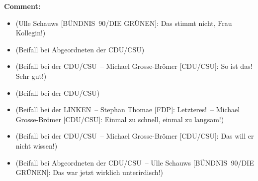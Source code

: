 \documentclass{article}
\begin{document}
\noindent\textbf{Comment:}
\begin{itemize}
    \setlength\itemsep{-3pt}
    \item (Ulle Schauws [BÜNDNIS 90/DIE GRÜNEN]: Das stimmt nicht, Frau Kollegin!)
    \setlength\itemsep{-3pt}
    \item (Beifall bei Abgeordneten der CDU/CSU)
    \setlength\itemsep{-3pt}
    \item (Beifall bei der CDU/CSU – Michael Grosse-­Brömer [CDU/CSU]: So ist das! Sehr gut!)
    \setlength\itemsep{-3pt}
    \item (Beifall bei der CDU/CSU)
    \setlength\itemsep{-3pt}
    \item (Beifall bei der LINKEN – Stephan Thomae [FDP]: Letzteres! – Michael Grosse-Brömer [CDU/CSU]: Einmal zu schnell, einmal zu langsam!)
    \setlength\itemsep{-3pt}
    \item (Beifall bei der CDU/CSU – Michael Grosse-­Brömer [CDU/CSU]: Das will er nicht wissen!)
    \setlength\itemsep{-3pt}
    \item (Beifall bei Abgeordneten der CDU/CSU – Ulle Schauws [BÜNDNIS 90/DIE GRÜNEN]: Das war jetzt wirklich unterirdisch!)
\end{itemize}
\end{document}
